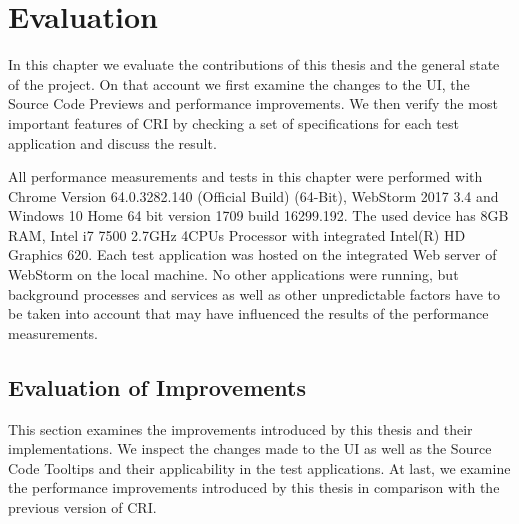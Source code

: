 \chapter{Evaluation}
\label{ch:Evaluation}
In this chapter we evaluate the contributions of this thesis and the general state of the project. On that account we first examine the changes to the UI, the Source Code Previews and performance improvements. We then verify the most important features of CRI by checking a set of specifications for each test application and discuss the result.

All performance measurements and tests in this chapter were performed with Chrome Version 64.0.3282.140 (Official Build) (64-Bit), WebStorm 2017 3.4 and Windows 10 Home 64 bit version 1709 build 16299.192. The used device has 8GB RAM, Intel i7 7500 2.7GHz 4CPUs Processor with integrated Intel(R) HD Graphics 620. Each test application was hosted on the integrated Web server of WebStorm on the local machine. No other applications were running, but background processes and services as well as other unpredictable factors have to be taken into account that may have influenced the results of the performance measurements.

\section{Evaluation of Improvements}
This section examines the improvements introduced by this thesis and their implementations. We inspect the changes made to the UI as well as the Source Code Tooltips and their applicability in the test applications. At last, we examine the performance improvements introduced by this thesis in comparison with the previous version of CRI.  

